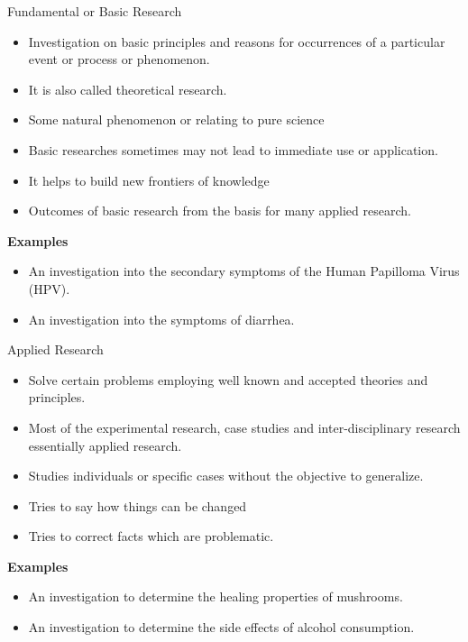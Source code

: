\begin{frame}[t]{Fundamental or Basic Research}
	\begin{itemize}
		\item Investigation on basic principles and reasons for occurrences of 
		a particular event or process or phenomenon.
		\item It is also called theoretical research.
		\item Some natural phenomenon or relating to pure science
		\item Basic researches sometimes may not lead to immediate use or 
		application.
		\item It helps to build new frontiers of knowledge 
		\item Outcomes of basic research from the basis for many applied 
		research.
	\end{itemize}
\textbf{Examples}
\begin{itemize}
	\item An investigation into the secondary symptoms of the Human Papilloma 
	Virus (HPV). 
	\item An investigation into the symptoms of diarrhea. 
\end{itemize}
\end{frame}

\begin{frame}[t]{Applied Research}
	\begin{itemize}
		\item Solve certain problems employing well known and accepted theories 
		and principles.
		\item Most of the experimental research, case studies and 
		inter-disciplinary research essentially applied research.
		\item Studies individuals or specific cases without the objective to 
		generalize.
		\item Tries to say how things can be changed 
		\item Tries to correct facts which are problematic.
	\end{itemize}

\textbf{Examples}
\begin{itemize}
	\item An investigation to determine the healing properties of mushrooms.
	\item An investigation to determine the side effects of alcohol 
	consumption. 
\end{itemize}
\end{frame}



